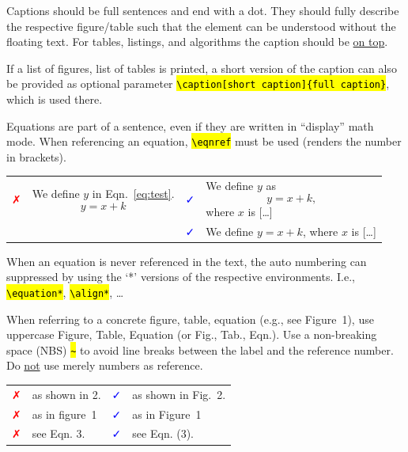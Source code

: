 \documentclass[10pt, a4paper]{article}
\newcommand{\code}[1]{\texttt{\hl{#1}}}
\newcommand{\genericbox}[4]{%
\footnotesize
\begin{tcolorbox}[width=.95\textwidth,colback={#1},title={#3},colbacktitle={#2},coltitle=black]
#4
\end{tcolorbox}
\normalsize
}
\newcommand{\examplesbox}[1]{%
\genericbox{blue!10!white}{blue!30!white}{\faHandORight\ Examples}{#1}
}
\newcommand{\protipbox}[1]{%
\genericbox{yellow!10!white}{yellow!30!white}{\faLightbulbO\ Pro Tip}{#1}
}
\newcommand{\exampleFalse}{%
    \textcolor{red}{\faClose}
}
\newcommand{\exampleCorrect}{%
    \textcolor{blue}{\faCheck}
}
\begin{document}
\begin{enumdescript}
    \item [Captions] Captions should be full sentences and end with a dot. They should fully describe the respective figure/table such that the element can be understood without the floating text. 
    For tables, listings, and algorithms the caption should be \uline{on top}.
    \protipbox{If a list of figures, list of tables is printed, a short version of the caption can also be provided as optional parameter \code{\textbackslash caption[short caption]\{full caption\}}, which is used there.
    }
    \item [Equations] Equations are part of a sentence, even if they are written in ``display'' math mode. 
    When referencing an equation, \code{\textbackslash eqnref} must be used (renders the number in brackets). 
    \examplesbox{
       \begin{tabularx}{\textwidth}{p{4mm}@{}X|p{4mm}@{}X}
           \exampleFalse 
           & We define $y$ in Eqn.~\eqref{eq:test}.
           \begin{equation} \label{eq:test}
            y = x + k
            \end{equation}
           & \exampleCorrect 
           & We define $y$ as 
           \begin{equation} 
            y = x + k \text{,}
            \end{equation}
            where $x$ is [\dots]  \\ 
           && \exampleCorrect & We define $y = x + k$, where $x$ is [\dots]
       \end{tabularx}
    }
    \protipbox{
        When an equation is never referenced in the text, the auto numbering can suppressed by using the `*' versions of the respective environments. I.e., \code{\textbackslash equation*}, \code{\textbackslash align*}, \dots
    }
    \item [References] When referring to a concrete figure, table, equation (e.g., see Figure~1), use uppercase Figure, Table, Equation (or Fig., Tab., Eqn.). Use a non-breaking space (NBS) \code{\textasciitilde} to avoid line breaks between the label and the reference number. 
    Do \uline{not} use merely numbers as reference. 
    \examplesbox{
       \begin{tabularx}{\textwidth}{p{4mm}@{}X|p{4mm}@{}X}
           \exampleFalse & as shown in 2. 
           & \exampleCorrect & as shown in Fig.~2. \\
           \exampleFalse & as in figure~1 & \exampleCorrect & as in Figure~1 \\ 
           \exampleFalse & see Eqn. 3. & \exampleCorrect & see Eqn. (3). \\ 
       \end{tabularx}
    }   
    

\end{enumdescript}
\end{document}

